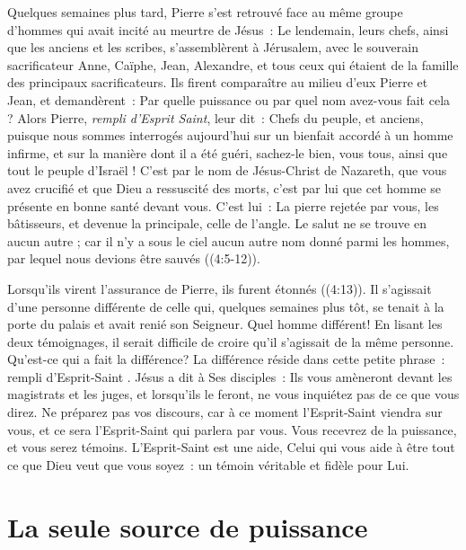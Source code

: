 \begin{specialpar}{}
Quelques semaines plus tard, Pierre s'est retrouvé face au même groupe
 d'hommes qui avait incité au meurtre de Jésus~:
 \og Le lendemain, leurs chefs, ainsi que les anciens et les scribes,
 s'assemblèrent à Jérusalem, avec le souverain sacrificateur Anne,
 Caïphe, Jean, Ale\-xandre, et tous ceux qui étaient de la famille
 des principaux sacrificateurs. Ils firent comparaître au milieu d'eux
 Pierre et Jean, et demandèrent~: Par quelle puissance ou par quel nom
 avez-vous fait cela ? Alors Pierre, \emph{rempli d'Esprit Saint}, leur dit~:
 Chefs du peuple, et anciens, puisque nous sommes interrogés aujourd'hui
 sur un bienfait accordé à un homme infirme, et sur la manière
 dont il a été guéri, sachez-le bien, vous tous, ainsi que tout le peuple
 d'Israël ! C'est par le nom de Jésus-Christ de Nazareth, que vous avez
 crucifié et que Dieu a ressuscité des morts, c'est par lui que cet homme
 se présente en bonne santé devant vous. C'est lui~: La pierre rejetée
 par vous, les bâtisseurs, et devenue la principale, celle de l'angle.
 Le salut ne se trouve en aucun autre ; car il n'y a sous le ciel aucun
 autre nom donné parmi les hommes, par lequel nous devions être
 sauvés \fg{} ((4:5-12)).
\end{specialpar}

\begin{specialpar}{\BRallowhypbch}
Lorsqu'ils virent l'assurance de Pierre, ils furent étonnés
 ((4:13)).
 Il s'agissait d'une personne différente
 de celle qui, quelques semaines plus tôt, se tenait à la porte du palais
 et avait renié son Seigneur. Quel homme différent!
 En lisant les deux témoignages, il serait difficile de croire
 qu'il s'agissait de la même personne. Qu'est-ce qui a fait la différence?
 La différence réside dans cette petite phrase~:
 \og rempli d'Esprit-Saint \fg{}. Jésus a dit à Ses disciples~:
 \og Ils vous amèneront devant les magistrats et les juges,
 et lorsqu'ils le feront, ne vous inquiétez pas de ce que vous direz.
 Ne préparez pas vos discours, car à ce moment l'Esprit-Saint viendra
 sur vous, et ce sera l'Esprit-Saint qui parlera par vous.
 Vous recevrez de la puissance, et vous serez témoins. \fg{}
 L'Esprit-Saint est une aide, Celui qui vous aide à être tout ce que Dieu
 veut que vous soyez~: un témoin véritable et fidèle pour Lui.
\end{specialpar}


\section*{La seule source de puissance}

